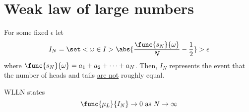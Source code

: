 \section{Weak law of large numbers}
For some fixed \(\epsilon\) let
\begin{equation*} 
    I_N = \set<\omega \in I>{\abs{\dfrac{\func{s_N}{\omega}}{N} - \dfrac{1}{2}} > \epsilon}
\end{equation*}
where \(\func{s_N}{\omega} = a_1 + a_2 + \dots + a_N\). Then, \(I_N\) represents the event that the number of heads and tails \underline{are not} roughly equal.
\begin{theorem}
    WLLN states 
    \begin{equation*}
        \func{\mu_L}{I_N} \to 0 \ \mathrm{as} \ N \to \infty
    \end{equation*}
\end{theorem}

